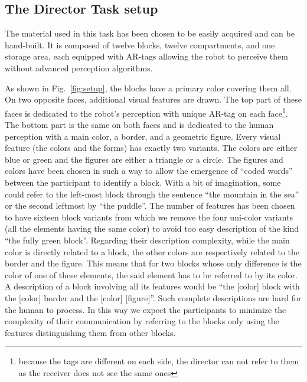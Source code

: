 \subsection{The Director Task setup}

The material used in this task has been chosen to be easily acquired and can be hand-built. It is composed of twelve blocks, twelve compartments, and one storage area, each equipped with AR-tags allowing the robot to perceive them without advanced perception algorithms.


As shown in Fig.~\ref{fig:setup}, the blocks have a primary color covering them all. On two opposite faces, additional visual features are drawn. The top part of these faces is dedicated to the robot's perception with unique AR-tag on each face\footnote{because the tags are different on each side, the director can not refer to them as the receiver does not see the same ones}. The bottom part is the same on both faces and is dedicated to the human perception with a main color, a border, and a geometric figure. Every visual feature (the colors and the forms) has exactly two variants. The colors are either blue or green and the figures are either a triangle or a circle.
The figures and colors have been chosen in such a way to allow the emergence of ``coded words'' between the participant to identify a block. With a bit of imagination, some could refer to the left-most block through the sentence ``the mountain in the sea'' or the second leftmost by ``the puddle''.
The number of features has been chosen to have sixteen block variants from which we remove the four uni-color variants (all the elements having the same color) to avoid too easy description of the kind ``the fully green block''.
Regarding their description complexity, while the main color is directly related to a block, the other colors are respectively related to the border and the figure. This means that for two blocks whose only difference is the color of one of these elements, the said element has to be referred to by its color. A description of a block involving all its features would be ``the [color] block with the [color] border and the [color] [figure]''. Such complete descriptions are hard for the human to process. In this way we expect the participants to minimize the complexity of their communication by referring to the blocks only using the features distinguishing them from other blocks.

